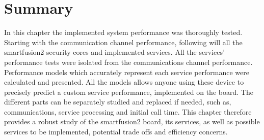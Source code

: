 

\section{Summary}\label{chap:evaluation:summary}

In this chapter the implemented system performance was thoroughly tested. Starting with the communication channel performance, following will all the smartfusion2 security cores and implemented services. All the services' performance tests were isolated from the communications channel performance. Performance models which accurately represent each service performance were calculated and presented. All the models allows anyone using these device to precisely predict a custom service performance, implemented on the board. The different parts can be separately studied and replaced if needed, such as, communications, service processing and initial call time. This chapter therefore provides a robust study of the smartfusion2 board, its services, as well as possible services to be implemented, potential trade offs and efficiency concerns.

